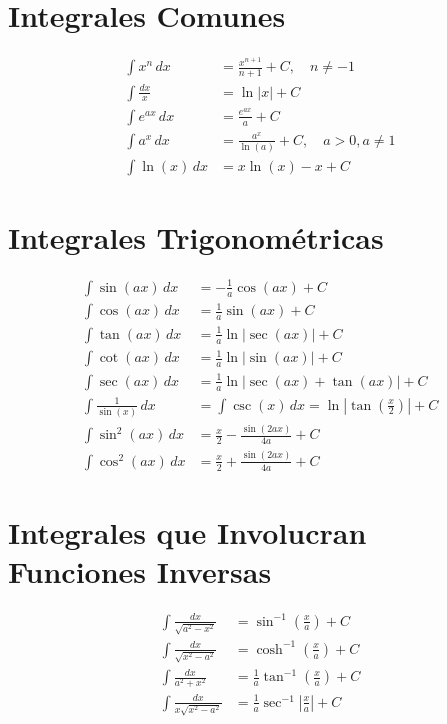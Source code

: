 \documentclass[11pt]{article}
\begin{document}
\newpage



\section*{Integrales Comunes}

\begin{align}
    \int x^n \, dx &= \frac{x^{n+1}}{n+1} + C, \quad n \neq -1 \\[10pt]
    \int \frac{dx}{x} &= \ln|x| + C \\[10pt]
    \int e^{ax} \, dx &= \frac{e^{ax}}{a} + C \\[10pt]
    \int a^{x} \, dx &= \frac{a^{x}}{\ln(a)} + C, \quad a > 0, a \neq 1 \\[10pt]
    \int \ln(x) \, dx &= x \ln(x) - x + C
\end{align}

\section*{Integrales Trigonométricas}


\begin{align}
    \int \sin(ax) \, dx &= -\frac{1}{a} \cos(ax) + C \\[10pt]
    \int \cos(ax) \, dx &= \frac{1}{a} \sin(ax) + C \\[10pt]
    \int \tan(ax) \, dx &= \frac{1}{a} \ln|\sec(ax)| + C \\[10pt]
    \int \cot(ax) \, dx &= \frac{1}{a} \ln|\sin(ax)| + C \\[10pt]
    \int \sec(ax) \, dx &= \frac{1}{a} \ln|\sec(ax) + \tan(ax)| + C \\[10pt]
    \int \frac{1}{\sin(x)} \, dx &= \int \csc(x) \, dx = \ln \left| \tan\left( \frac{x}{2} \right) \right| + C \\[10pt]
    \int \sin^2(ax) \, dx &= \frac{x}{2} - \frac{\sin(2ax)}{4a} + C \\[10pt]
    \int \cos^2(ax) \, dx &= \frac{x}{2} + \frac{\sin(2ax)}{4a} + C
\end{align}


\section*{Integrales que Involucran Funciones Inversas}

\begin{align}
    \int \frac{dx}{\sqrt{a^2 - x^2}} &= \sin^{-1}\left(\frac{x}{a}\right) + C \\[10pt]
    \int \frac{dx}{\sqrt{x^2 - a^2}} &= \cosh^{-1}\left(\frac{x}{a}\right) + C \\[10pt]
    \int \frac{dx}{a^2 + x^2} &= \frac{1}{a} \tan^{-1}\left(\frac{x}{a}\right) + C \\[10pt]
    \int \frac{dx}{x \sqrt{x^2 - a^2}} &= \frac{1}{a} \sec^{-1}\left|\frac{x}{a}\right| + C
\end{align}
\end{document}
